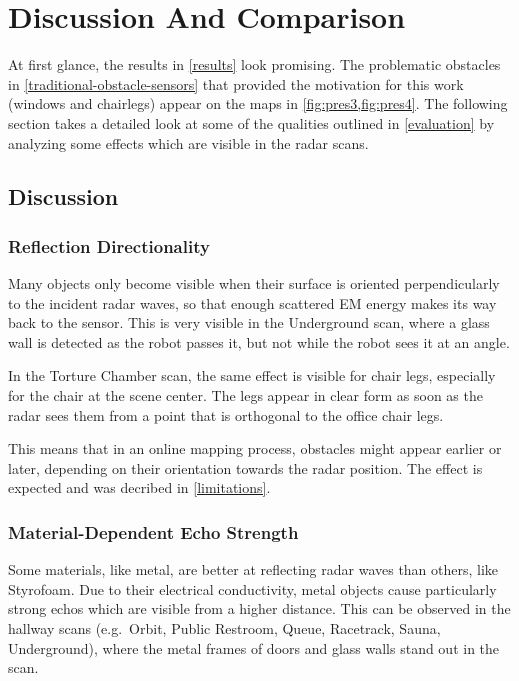 \chapter{Discussion And Comparison} \label{discussion-and-comparison}
At first glance, the results in \cref{results} look promising. The problematic obstacles in \cref{traditional-obstacle-sensors} that provided the motivation for this work (windows and chairlegs) appear on the maps in \cref{fig:pres3,fig:pres4}. The following section takes a detailed look at some of the qualities outlined in \cref{evaluation} by analyzing some effects which are visible in the radar scans.


\section{Discussion}


\subsection{Reflection Directionality} \label{reflection-directionality}
Many objects only become visible when their surface is oriented
perpendicularly to the incident radar waves, so that enough scattered EM
energy makes its way back to the sensor. This is very visible in the
Underground scan, where a glass wall is detected as the robot passes it,
but not while the robot sees it at an angle.

In the Torture Chamber scan, the same effect is visible for chair legs,
especially for the chair at the scene center. The legs appear in clear
form as soon as the radar sees them from a point that is orthogonal
to the office chair legs.

This means that in an online mapping process, obstacles might appear earlier or later, depending on their orientation towards the radar position. The effect is expected and was decribed in \cref{limitations}.


\subsection{Material-Dependent Echo Strength} \label{material-dependent-echo-strength}
Some materials, like metal, are better at reflecting radar
waves than others, like Styrofoam. Due to their electrical conductivity, metal objects cause particularly strong echos which are visible from a higher distance. This can be observed in the hallway scans (e.g.~Orbit, Public Restroom, Queue,
Racetrack, Sauna, Underground), where the metal frames of doors and
glass walls stand out in the scan.


